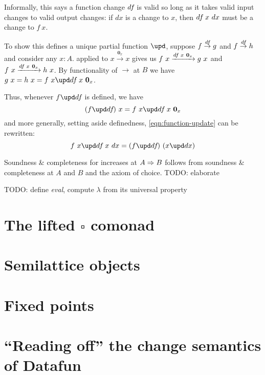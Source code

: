 \documentclass{rntz}
\newcommand\todo[1]{{\color{Rhodamine}#1}}
\newcommand\zero{\ensuremath{\mathbold{0}}}
\newcommand\iso{\texorpdfstring{\ensuremath{\square}}{iso}}
\newcommand\fname[1]{\textit{#1}}
\newcommand\vals[1]{#1^v} %
\newcommand\bindsp{~\,}
\newcommand\fa[1]{\forall #1.\bindsp}
\newcommand\ex[1]{\exists #1.\bindsp}
\newcommand\validarrow\to
\newcommand\vld[3]{{#2 \mathrel{\overset{#1}{\validarrow}} #3}}
\newcommand\longvld[3]{{#2 \xrightarrow{#1} #3}}
\begin{document}
\noindent Informally, this says a function change $d\kern-.1em f\kern-.1em$ is valid so long as it
takes valid input changes to valid output changes: if $dx$ is a change to $x$,
then $d\kern-.1em f\kern-.1em~x~dx$ must be a change to $f~x$.

To show this defines a unique partial function $\upd$, suppose $\vld\df f g$ and
$\vld\df f h$ and consider any $x : A$.  applied to
$\vld{\zero_x} x x$ gives us $\longvld{\df~x~\zero_x}{f~x}{g~x}$ and
$\longvld{\df~x~\zero_x}{f~x}{h~x}$. By functionality of $\validarrow$ at $B$ we
have $g~x = h~x = f~x \upd \df~x~\zero_x$.

Thus, whenever $f \upd \df$ is defined, we have
%
\[ (f \upd \df)~x = f~x \upd \df~x~\zero_x \]
%
and more generally, setting aside definedness, \cref{eqn:function-update} can be
rewritten:
%
\[ f~x \upd \df~x~dx = (f \upd \df)~(x \upd dx) \]

\noindent
Soundness \& completeness for increases at $A \Rightarrow B$ follows from soundness \&
completeness at $A$ and $B$ and the axiom of choice. \todo{TODO: elaborate}


% 


\newcommand\fn\lambda
\todo{TODO: define \fname{eval}, compute $\fn$ from its universal property}


\section{The lifted \iso{} comonad}

\section{Semilattice objects}

\section{Fixed points}


\section{``Reading off'' the change semantics of Datafun}
\end{document}
